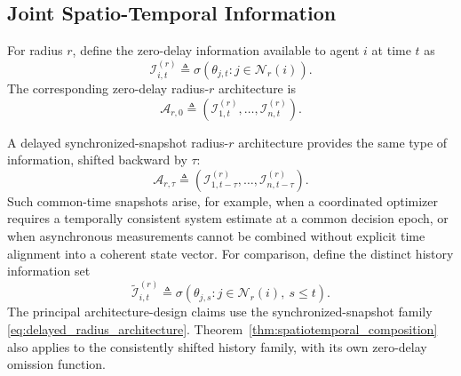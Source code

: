\documentclass[11pt]{article}
\begin{document}
\subsection{Joint Spatio-Temporal Information}
\label{subsec:joint_spatiotemporal}

For radius $r$, define the zero-delay information available to agent $i$ at
time $t$ as
\begin{equation}
    \mathcal{I}_{i,t}^{(r)}
    \triangleq
    \sigma\!\left(
        \theta_{j,t}:j\in\mathcal{N}_r(i)
    \right).
    \label{eq:zero_delay_radius_information}
\end{equation}
The corresponding zero-delay radius-$r$ architecture is
\begin{equation}
    \mathcal{A}_{r,0}
    \triangleq
    \left(
        \mathcal{I}_{1,t}^{(r)},
        \ldots,
        \mathcal{I}_{n,t}^{(r)}
    \right).
    \label{eq:zero_delay_radius_architecture}
\end{equation}

A delayed synchronized-snapshot radius-$r$ architecture provides the same type
of information, shifted backward by $\tau$:
\begin{equation}
    \mathcal{A}_{r,\tau}
    \triangleq
    \left(
        \mathcal{I}_{1,t-\tau}^{(r)},
        \ldots,
        \mathcal{I}_{n,t-\tau}^{(r)}
    \right).
    \label{eq:delayed_radius_architecture}
\end{equation}
Such common-time snapshots arise, for example, when a coordinated optimizer
requires a temporally consistent system estimate at a common decision epoch, or
when asynchronous measurements cannot be combined without explicit time
alignment into a coherent state vector.
For comparison, define the distinct history information set
\begin{equation}
\widetilde{\mathcal I}_{i,t}^{(r)}
\triangleq
\sigma\!\left(
  \theta_{j,s}:j\in\mathcal N_r(i),\ s\le t
\right).
\label{eq:history_radius_information}
\end{equation}
The principal architecture-design claims use the synchronized-snapshot family
\eqref{eq:delayed_radius_architecture}. Theorem~\ref{thm:spatiotemporal_composition}
also applies to the consistently shifted history family, with its own
zero-delay omission function.
\end{document}
